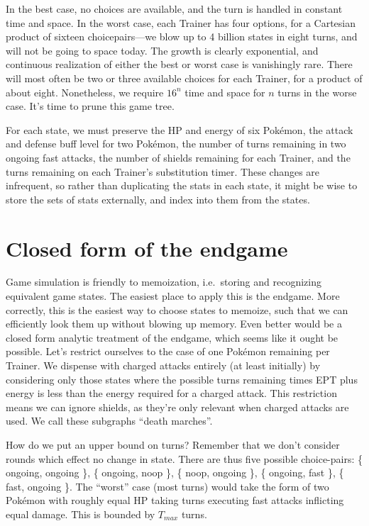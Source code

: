 In the best case, no choices are available, and the turn is handled in constant
  time and space.
In the worst case, each Trainer has four options, for a Cartesian product
  of sixteen choicepairs---we blow up to 4 billion states in eight turns,
  and will not be going to space today.
The growth is clearly exponential, and continuous realization of either the
  best or worst case is vanishingly rare.
There will most often be two or three available choices for each Trainer,
  for a product of about eight.
Nonetheless, we require $16^n$ time and space for $n$ turns in the worse case.
It's time to prune this game tree.

For each state, we must preserve the HP and energy of six Pokémon,
  the attack and defense buff level for two Pokémon,
  the number of turns remaining in two ongoing fast attacks,
  the number of shields remaining for each Trainer,
  and the turns remaining on each Trainer's substitution timer.
These changes are infrequent, so rather than duplicating the stats in
  each state, it might be wise to store the sets of stats externally,
  and index into them from the states.

\section{Closed form of the endgame}
Game simulation is friendly to memoization, i.e.\ storing and recognizing equivalent game states.
The easiest place to apply this is the endgame.
More correctly, this is the easiest way to choose states to memoize,
  such that we can efficiently look them up without blowing up memory.
Even better would be a closed form analytic treatment of the endgame,
  which seems like it ought be possible.
Let's restrict ourselves to the case of one Pokémon remaining per Trainer.
We dispense with charged attacks entirely (at least initially) by considering
  only those states where the possible turns remaining times EPT plus
  energy is less than the energy required for a charged attack.
This restriction means we can ignore shields, as they're only relevant
  when charged attacks are used.
We call these subgraphs ``death marches''.

How do we put an upper bound on turns?
Remember that we don't consider rounds which effect no change in state.
There are thus five possible choice-pairs:
  \{ ongoing, ongoing \},
  \{ ongoing, noop \},
  \{ noop, ongoing \},
  \{ ongoing, fast \},
  \{ fast, ongoing \}.
The ``worst'' case (most turns) would take the form of two Pokémon
  with roughly equal HP taking turns executing fast attacks
  inflicting equal damage.
This is bounded by $T_{max}$ turns.

